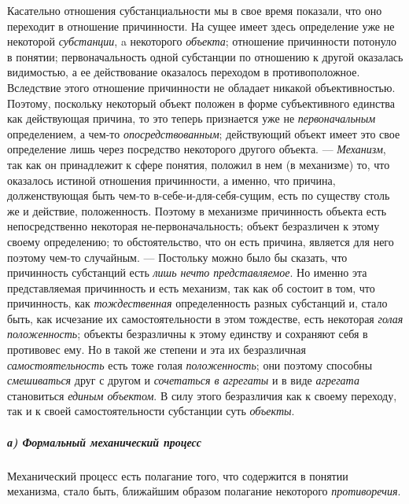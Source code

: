 \documentclass[twoside]{article}
\begin{document}
{{{{{{Касательно отношения субстанциальности мы в свое время
показали, что оно переходит в отношение причинности. На сущее имеет здесь
определение уже не некоторой
{\em субстанции}, a
некоторого {\em объекта};
отношение причинности потонуло в понятии; первоначальность
одной субстанции по отношению к другой оказалась видимостью, а ее
действование оказалось переходом в противоположное. Вследствие этого
отношение причинности не обладает никакой объективностью. Поэтому,
поскольку некоторый объект положен в форме субъективного единства как
действующая причина, то это теперь признается уже не
{\em первоначальным}
определением, а чем-то
{\em опосредствованным};
действующий объект имеет это свое определение лишь через
посредство некоторого другого объекта. —
{\em Механизм}, так как он
принадлежит к сфере понятия, положил в нем (в механизме) то, что оказалось
истиной отношения причинности, а именно, что причина, долженствующая быть
чем-то в-себе-и-для-себя-сущим, есть по существу столь же и действие,
положенность. Поэтому в механизме причинность объекта есть непосредственно
некоторая не-первоначальность; объект безразличен к этому своему
определению; то обстоятельство, что он есть причина, является для него
поэтому чем-то случайным. — Постольку можно было бы сказать,
что причинность субстанций есть
{\em лишь нечто представляемое}.
Но именно эта представляемая причинность и есть механизм, так
как об состоит в том, что причинность, как
{\em тождественная}
определенность разных субстанций и, стало быть, как исчезание
их самостоятельности в этом тождестве, есть некоторая
{\em голая положенность};
объекты безразличны к этому единству и сохраняют себя в
противовес ему. Но в такой же степени и эта их безразличная
{\em самостоятельность}
есть тоже голая
{\em положенность}; они
поэтому способны {\em смешиваться}
друг с другом и
{\em сочетаться в агрегаты}
и в виде {\em агрегата}
становиться {\em единым
объектом}. В силу этого безразличия как к своему переходу,
так и к своей самостоятельности субстанции суть
{\em объекты}.

\subparagraph[а) Формальный механический процесс]{а) Формальный механический процесс}
Механический процесс есть полагание того, что содержится в
понятии механизма, стало быть, ближайшим образом полагание некоторого
{\em противоречия}.


}}}}}}
\end{document}
